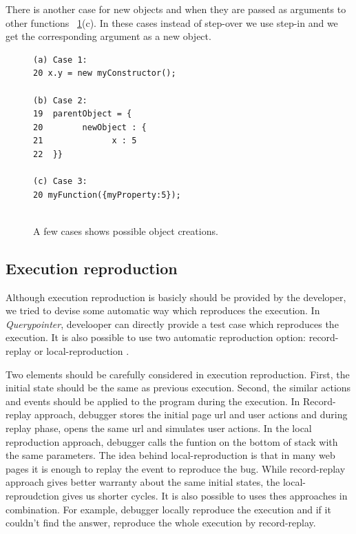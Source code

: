 \documentclass[preprint]{sigplanconf}
\begin{document}
There is another case for new objects and when they are passed as
arguments to other functions ~\ref{fig:objectCreation}(c). In these
cases instead of step-over we use step-in and we get the corresponding
argument as a new object.


\begin{figure}[htp]
\begin{verbatim}
(a) Case 1:
20 x.y = new myConstructor();

(b) Case 2:
19  parentObject = {
20   	  newObject : {
21  			x : 5
22  }}

(c) Case 3:
20 myFunction({myProperty:5});
 
\end{verbatim}
\caption{A few cases shows possible object creations.}
\label{fig:objectCreation}
\end{figure}

  
\subsection{Execution reproduction}
Although execution reproduction is basicly should be provided by the
developer, we tried to devise some automatic way which reproduces the
execution. In \textit{Querypointer}, develooper can directly provide a
test case which reproduces the execution. It is also possible to use
two automatic reproduction option: record-replay or local-reproduction
.

Two elements should be carefully considered in execution
reproduction. First, the initial state should be the same as previous
execution. Second, the similar actions and events should be applied to
the program during the execution. In Record-replay approach, debugger
stores the initial page url and user actions and during replay phase,
opens the same url and simulates user actions. In the local
reproduction approach, debugger calls the funtion on the bottom of
stack with the same parameters. The idea behind local-reproduction is
that in many web pages it is enough to replay the event to reproduce
the bug. While record-replay approach gives better warranty about the
same initial states, the local-reproudction gives us shorter
cycles. It is also possible to uses thes approaches in
combination. For example, debugger locally reproduce the execution and
if it couldn't find the answer, reproduce the whole execution by
record-replay.
\end{document}
